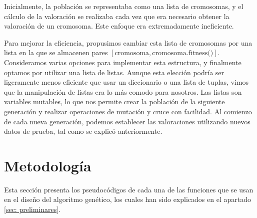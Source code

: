 \documentclass[conference,a4paper]{IEEEtran}
\begin{document}
Inicialmente, la población se representaba como una lista de cromosomas, y el cálculo de la valoración se realizaba cada vez que era necesario obtener la valoración de un cromosoma. Este enfoque era extremadamente ineficiente.

Para mejorar la eficiencia, propusimos cambiar esta lista de cromosomas por una lista en la que se almacenen pares \([\text{cromosoma}, \text{cromosoma.fitness()}]\). Consideramos varias opciones para implementar esta estructura, y finalmente optamos por utilizar una lista de listas. Aunque esta elección podría ser ligeramente menos eficiente que usar un diccionario o una lista de tuplas, vimos que la manipulación de listas era lo más comodo para nosotros. Las listas son variables mutables, lo que nos permite crear la población de la siguiente generación y realizar operaciones de mutación y cruce con facilidad. Al comienzo de cada nueva generación, podemos establecer las valoraciones utilizando nuevos datos de prueba, tal como se explicó anteriormente.


\section{Metodología}

Esta sección presenta los pseudocódigos de cada una de las funciones que se usan en el diseño del algoritmo genético, los cuales han sido explicados en el apartado \ref{sec: preliminares}.
\end{document}
